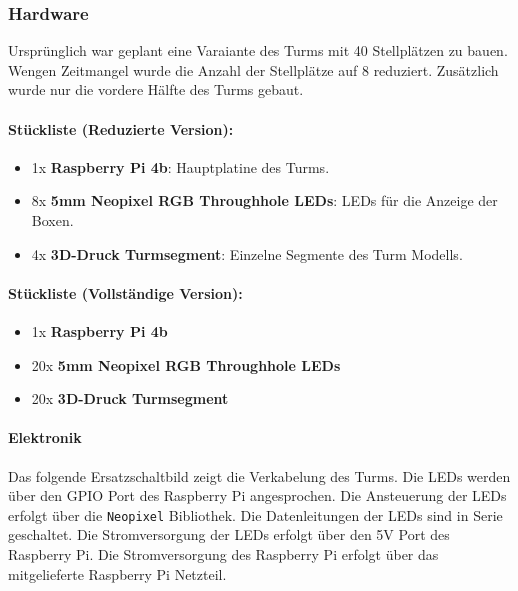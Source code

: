 \subsubsection{Hardware}

Ursprünglich war geplant eine Varaiante des Turms mit 40 Stellplätzen zu bauen. Wengen Zeitmangel wurde die Anzahl der Stellplätze auf 8 reduziert. Zusätzlich wurde nur die vordere Hälfte des Turms gebaut.

\paragraph{Stückliste (Reduzierte Version):}
\begin{itemize}
  \item 1x \textbf{Raspberry Pi 4b}: Hauptplatine des Turms.
  \item 8x \textbf{5mm Neopixel RGB Throughhole LEDs}: LEDs für die Anzeige der Boxen.
  \item 4x \textbf{3D-Druck Turmsegment}: Einzelne Segmente des Turm Modells.
\end{itemize}

\paragraph{Stückliste (Vollständige Version):}
\begin{itemize}
  \item 1x \textbf{Raspberry Pi 4b}
  \item 20x \textbf{5mm Neopixel RGB Throughhole LEDs}
  \item 20x \textbf{3D-Druck Turmsegment}
\end{itemize}

\clearpage

\paragraph{Elektronik}

Das folgende Ersatzschaltbild zeigt die Verkabelung des Turms. Die LEDs werden über den GPIO Port des Raspberry Pi angesprochen. Die Ansteuerung der LEDs erfolgt über die \texttt{Neopixel} Bibliothek. Die Datenleitungen der LEDs sind in Serie geschaltet. Die Stromversorgung der LEDs erfolgt über den 5V Port des Raspberry Pi. Die Stromversorgung des Raspberry Pi erfolgt über das mitgelieferte Raspberry Pi Netzteil.

